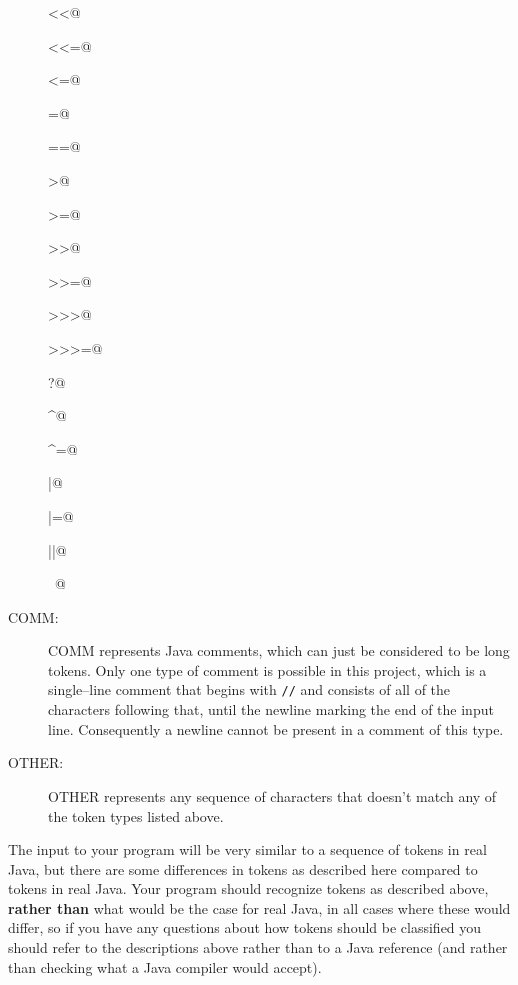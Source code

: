 \documentclass[11pt]{article}
\begin{document}
\begin{description}
\begin{multicols}{10}
                  \verb@<<@

                  \verb@<<=@

                  \verb@<=@

                  \verb@=@

                  \verb@==@

                  \verb@>@

                  \verb@>=@

                  \verb@>>@

                  \verb@>>=@

                  \verb@>>>@

                  \verb@>>>=@

                  \verb@?@

                  \verb@^@

                  \verb@^=@

                  \verb@|@

                  \verb@|=@

                  \verb@||@

                  \verb@~@

                \end{multicols}

                \vspace{-3.5mm}

          \item[COMM:] COMM represents Java comments, which can just be
                considered to be long tokens.  Only one type of comment is
                possible in this project, which is a single--line comment
                that begins with \texttt{//} and consists of all of the
                characters following that, until the newline marking the end
                of the input line.  Consequently a newline cannot be present
                in a comment of this type.

          \item[OTHER:] OTHER represents any sequence of characters that
                doesn't match any of the token types listed above.

        \end{description}

        \vspace{-.5mm}

        The input to your program will be very similar to a sequence of tokens
      in real Java, but there are some differences in tokens as described
      here compared to tokens in real Java.  Your program should recognize
      tokens as described above, \textbf{rather than} what would be the case
      for real Java, in all cases where these would differ, so if you have
      any questions about how tokens should be classified you should refer
      to the descriptions above rather than to a Java reference (and rather
      than checking what a Java compiler would accept).
\end{document}
